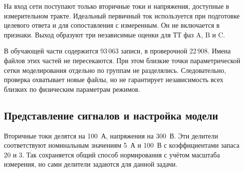 На вход сети поступают только вторичные токи
и напряжения, доступные в измерительном тракте.
Идеальный первичный ток используется при подготовке
целевого ответа и для сопоставления с измеренным.
Он не включается в признаки.
Выход образуют три независимые оценки
для ТТ фаз A, B и C.

В обучающей части содержится 93\,063 записи,
в проверочной 22\,908. Имена файлов этих частей
не пересекаются. При этом близкие точки
параметрической сетки моделирования отдельно
по группам не разделялись.
Следовательно, проверка охватывает новые файлы,
но не гарантирует независимость всех близких
по физическим параметрам режимов.

\subsection{Представление сигналов и настройка модели}
\label{sec:ch4_ct_inputs}

Вторичные токи делятся на 100~А,
напряжения на 300~В. Эти делители соответствуют
номинальным значениям 5~А и 100~В
с коэффициентами запаса 20 и 3.
Так сохраняется общий способ нормирования
с учётом масштаба измерения, но сами делители
задаются для данной задачи.

